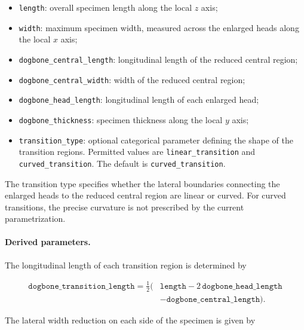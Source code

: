 \begin{itemize}
    \item \texttt{length}: overall specimen length
    along the local $z$ axis;

    \item \texttt{width}: maximum specimen width,
    measured across the enlarged heads along
    the local $x$ axis;

    \item \texttt{dogbone\_central\_length}:
    longitudinal length of the reduced central
    region;

    \item \texttt{dogbone\_central\_width}:
    width of the reduced central region;

    \item \texttt{dogbone\_head\_length}:
    longitudinal length of each enlarged head;

    \item \texttt{dogbone\_thickness}:
    specimen thickness along the local $y$ axis;

    \item \texttt{transition\_type}:
    optional categorical parameter defining
    the shape of the transition regions.
    Permitted values are
    \texttt{linear\_transition} and
    \texttt{curved\_transition}.
    The default is \texttt{curved\_transition}.
\end{itemize}

The transition type specifies whether the lateral
boundaries connecting the enlarged heads to the
reduced central region are linear or curved.
For curved transitions, the precise curvature
is not prescribed by the current parametrization.

\paragraph{Derived parameters.}

The longitudinal length of each transition region
is determined by

\begin{equation}
\begin{aligned}
\texttt{dogbone\_transition\_length}
= \frac{1}{2}\bigl(
&\texttt{length}
-2\,\texttt{dogbone\_head\_length}\\
&-\texttt{dogbone\_central\_length}
\bigr).
\end{aligned}
\end{equation}

The lateral width reduction on each side of the
specimen is given by

